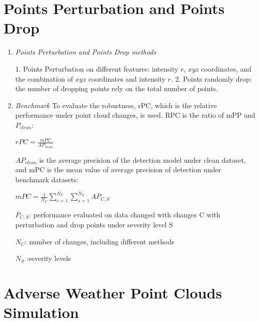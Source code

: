\section{Points Perturbation and Points Drop}

\begin{enumerate}
\item\textit{Points Perturbation and Points Drop methods}

1. Points Perturbation on different features: intensity \(r\), \(xyz\) coordinates, and the combination of \(xyz\) coordinates and intensity \(r\).
2. Points randomly drop: the number of dropping points rely on the total number of points.
 \item \textit{Benchmark}
 To evaluate the robustness, rPC, which is the relative performance under point cloud changes, is used. RPC is the ratio of mPP and \(P_{clean}\):
\begin{center}
          \(rPC = \frac{mPC}{AP_{clean}} \)
\end{center}
\(AP_{clean}\) is the average precision of the detection model under clean dataset, and mPC is the mean value of average precision of detection under benchmark datasets:
\begin{center}
          \(mPC = \frac{1}{N_{C}}\sum_{c=1}^{N_{C}}\sum_{s=1}^{N_{S}}{AP_{C,S}} \)
\end{center}
\({P_{C,S}}\): performance evaluated on data changed with changes C with perturbation and drop points under severity level S

\({N_{C}}\): number of changes, including different methods

\({N_{S}}\) :severity levels

\end{enumerate}

\section{Adverse Weather Point Clouds Simulation}

